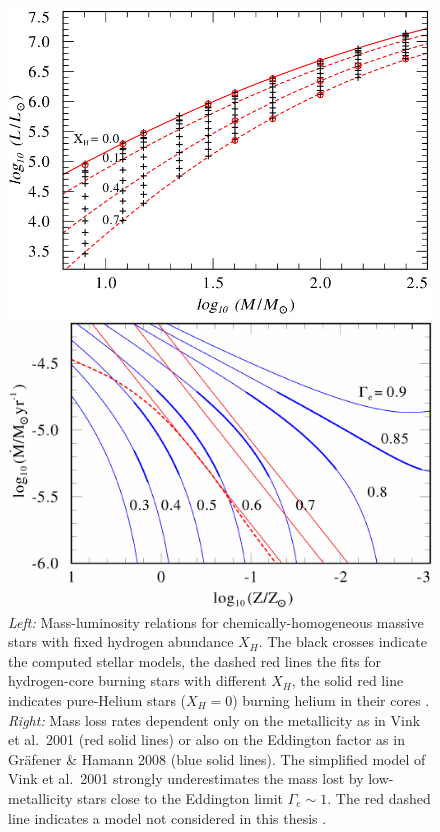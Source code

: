 \documentclass[a4paper,titlepage]{book}     	%
\begin{document}
 
\begin{figure}[h]
	\begin{minipage}{.49\textwidth}
		\centering
		\includegraphics[width=.94\textwidth]{./images/MLrelation.png}
	\end{minipage}
	\hfill
	\begin{minipage}{.49\textwidth}
		\centering
		\includegraphics[width=\textwidth]{./images/stellarwinds.pdf}	
	\end{minipage}
	\caption{\emph{Left:} Mass-luminosity relations for chemically-homogeneous massive stars with fixed hydrogen abundance $X_H$. The black crosses indicate the computed stellar models, the dashed red lines the fits for hydrogen-core burning stars with different $X_H$, the solid red line indicates pure-Helium stars ($X_H = 0$) burning helium in their cores \cite{Grafener2011_M-L_WR}. \emph{Right:} Mass loss rates dependent only on the metallicity as in Vink et al.\ 2001 \cite{Vink2001} (red solid lines) or also on the Eddington factor as in Gr{\"a}fener \& Hamann 2008 \cite{G&H_WRmassloss} (blue solid lines). The simplified model of Vink et al.\ 2001 strongly underestimates the mass lost by low-metallicity stars close to the Eddington limit $\Gamma_e \sim 1$. The red dashed line indicates a model not considered in this thesis \cite{G&H_WRmassloss}.}\label{fig:MLandwinds}
\end{figure}
\end{document}
